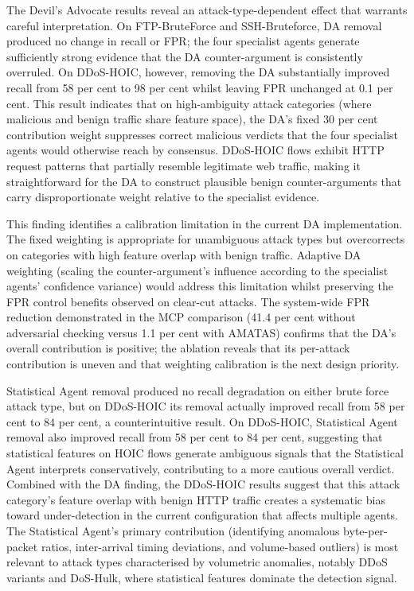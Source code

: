 The Devil's Advocate results reveal an attack-type-dependent effect that warrants careful interpretation. On FTP-BruteForce and SSH-Bruteforce, DA removal produced no change in recall or FPR; the four specialist agents generate sufficiently strong evidence that the DA counter-argument is consistently overruled. On DDoS-HOIC, however, removing the DA substantially improved recall from 58 per cent to 98 per cent whilst leaving FPR unchanged at 0.1 per cent. This result indicates that on high-ambiguity attack categories (where malicious and benign traffic share feature space), the DA's fixed 30 per cent contribution weight suppresses correct malicious verdicts that the four specialist agents would otherwise reach by consensus. DDoS-HOIC flows exhibit HTTP request patterns that partially resemble legitimate web traffic, making it straightforward for the DA to construct plausible benign counter-arguments that carry disproportionate weight relative to the specialist evidence.

This finding identifies a calibration limitation in the current DA implementation. The fixed weighting is appropriate for unambiguous attack types but overcorrects on categories with high feature overlap with benign traffic. Adaptive DA weighting (scaling the counter-argument's influence according to the specialist agents' confidence variance) would address this limitation whilst preserving the FPR control benefits observed on clear-cut attacks. The system-wide FPR reduction demonstrated in the MCP comparison (41.4 per cent without adversarial checking versus 1.1 per cent with AMATAS) confirms that the DA's overall contribution is positive; the ablation reveals that its per-attack contribution is uneven and that weighting calibration is the next design priority.

Statistical Agent removal produced no recall degradation on either brute force attack type, but on DDoS-HOIC its removal actually improved recall from 58 per cent to 84 per cent, a counterintuitive result. On DDoS-HOIC, Statistical Agent removal also improved recall from 58 per cent to 84 per cent, suggesting that statistical features on HOIC flows generate ambiguous signals that the Statistical Agent interprets conservatively, contributing to a more cautious overall verdict. Combined with the DA finding, the DDoS-HOIC results suggest that this attack category's feature overlap with benign HTTP traffic creates a systematic bias toward under-detection in the current configuration that affects multiple agents. The Statistical Agent's primary contribution (identifying anomalous byte-per-packet ratios, inter-arrival timing deviations, and volume-based outliers) is most relevant to attack types characterised by volumetric anomalies, notably DDoS variants and DoS-Hulk, where statistical features dominate the detection signal.

